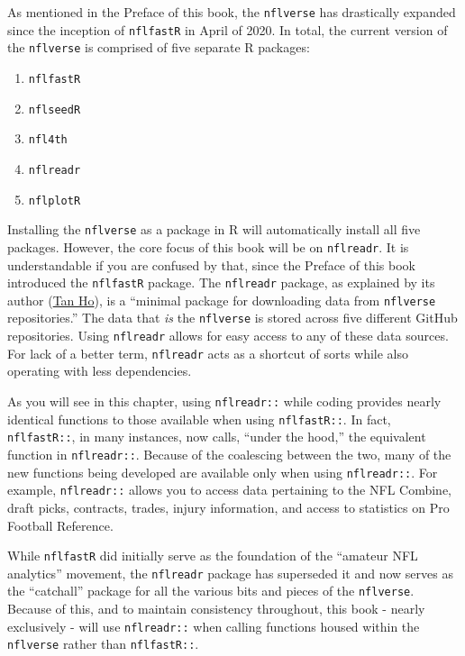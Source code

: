\documentclass[
  letterpaper,
]{krantz}
\providecommand{\tightlist}{%
  \setlength{\itemsep}{0pt}\setlength{\parskip}{0pt}}\usepackage{longtable,booktabs,array}
\begin{document}
As mentioned in the Preface of this book, the \texttt{nflverse} has
drastically expanded since the inception of \texttt{nflfastR} in April
of 2020. In total, the current version of the \texttt{nflverse} is
comprised of five separate R packages:

\begin{enumerate}
\def\labelenumi{\arabic{enumi}.}
\tightlist
\item
  \texttt{nflfastR}
\item
  \texttt{nflseedR}
\item
  \texttt{nfl4th}
\item
  \texttt{nflreadr}
\item
  \texttt{nflplotR}
\end{enumerate}

Installing the \texttt{nflverse} as a package in R will automatically
install all five packages. However, the core focus of this book will be
on \texttt{nflreadr}. It is understandable if you are confused by that,
since the Preface of this book introduced the \texttt{nflfastR} package.
The \texttt{nflreadr} package, as explained by its author
(\href{https://tanho.ca/}{Tan Ho}), is a ``minimal package for
downloading data from \texttt{nflverse} repositories.'' The data that
\emph{is} the \texttt{nflverse} is stored across five different GitHub
repositories. Using \texttt{nflreadr} allows for easy access to any of
these data sources. For lack of a better term, \texttt{nflreadr} acts as
a shortcut of sorts while also operating with less dependencies.

As you will see in this chapter, using \texttt{nflreadr::} while coding
provides nearly identical functions to those available when using
\texttt{nflfastR::}. In fact, \texttt{nflfastR::}, in many instances,
now calls, ``under the hood,'' the equivalent function in
\texttt{nflreadr::}. Because of the coalescing between the two, many of
the new functions being developed are available only when using
\texttt{nflreadr::}. For example, \texttt{nflreadr::} allows you to
access data pertaining to the NFL Combine, draft picks, contracts,
trades, injury information, and access to statistics on Pro Football
Reference.

While \texttt{nflfastR} did initially serve as the foundation of the
``amateur NFL analytics'' movement, the \texttt{nflreadr} package has
superseded it and now serves as the ``catchall'' package for all the
various bits and pieces of the \texttt{nflverse}. Because of this, and
to maintain consistency throughout, this book - nearly exclusively -
will use \texttt{nflreadr::} when calling functions housed within the
\texttt{nflverse} rather than \texttt{nflfastR::}.
\end{document}
